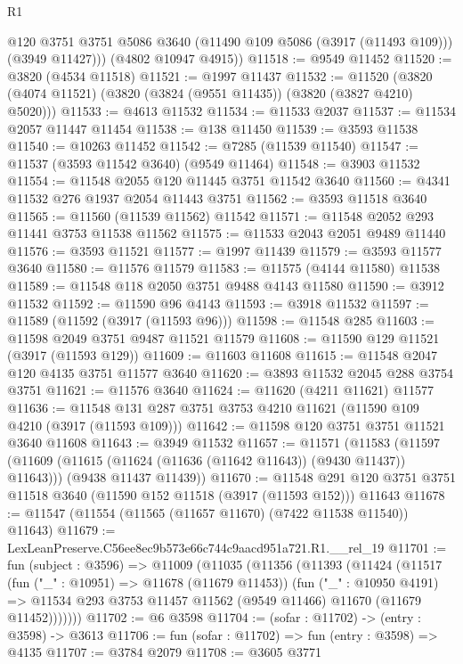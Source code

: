 \begin{lexlean}{R1}
\begin{coremodule}
          @120
          @3751
          @3751
          @5086
          @3640
          (@11490 @109 @5086 (@3917 (@11493 @109)))
          (@3949 @11427)))
      (@4802 @10947 @4915))
@11518 := @9549 @11452
@11520 := @3820 (@4534 @11518)
@11521 := @1997 @11437
@11532 := @11520 (@3820 (@4074 @11521) (@3820 (@3824 (@9551 @11435)) (@3820 (@3827 @4210) @5020)))
@11533 := @4613 @11532
@11534 := @11533 @2037
@11537 := @11534 @2057 @11447 @11454
@11538 := @138 @11450
@11539 := @3593 @11538
@11540 := @10263 @11452
@11542 := @7285 (@11539 @11540)
@11547 := @11537 (@3593 @11542 @3640) (@9549 @11464)
@11548 := @3903 @11532
@11554 := @11548 @2055 @120 @11445 @3751 @11542 @3640
@11560 := @4341 @11532 @276 @1937 @2054 @11443 @3751
@11562 := @3593 @11518 @3640
@11565 := @11560 (@11539 @11562) @11542
@11571 := @11548 @2052 @293 @11441 @3753 @11538 @11562
@11575 := @11533 @2043 @2051 @9489 @11440
@11576 := @3593 @11521
@11577 := @1997 @11439
@11579 := @3593 @11577 @3640
@11580 := @11576 @11579
@11583 := @11575 (@4144 @11580) @11538
@11589 := @11548 @118 @2050 @3751 @9488 @4143 @11580
@11590 := @3912 @11532
@11592 := @11590 @96 @4143
@11593 := @3918 @11532
@11597 := @11589 (@11592 (@3917 (@11593 @96)))
@11598 := @11548 @285
@11603 := @11598 @2049 @3751 @9487 @11521 @11579
@11608 := @11590 @129 @11521 (@3917 (@11593 @129))
@11609 := @11603 @11608
@11615 := @11548 @2047 @120 @4135 @3751 @11577 @3640
@11620 := @3893 @11532 @2045 @288 @3754 @3751
@11621 := @11576 @3640
@11624 := @11620 (@4211 @11621) @11577
@11636 := @11548 @131 @287 @3751 @3753 @4210 @11621 (@11590 @109 @4210 (@3917 (@11593 @109)))
@11642 := @11598 @120 @3751 @3751 @11521 @3640 @11608
@11643 := @3949 @11532
@11657 := @11571
    (@11583
      (@11597 (@11609 (@11615 (@11624 (@11636 (@11642 @11643)) (@9430 @11437)) @11643)))
      (@9438 @11437 @11439))
@11670 := @11548
    @291
    @120
    @3751
    @3751
    @11518
    @3640
    (@11590 @152 @11518 (@3917 (@11593 @152)))
    @11643
@11678 := @11547 (@11554 (@11565 (@11657 @11670) (@7422 @11538 @11540)) @11643)
@11679 := LexLeanPreserve.C56ee8ec9b573e66c744c9aacd951a721.R1.__rel_19
@11701 := fun (subject : @3596) =>
  @11009
    (@11035
      (@11356
        (@11393
          (@11424
            (@11517
              (fun ("_" : @10951) => @11678 (@11679 @11453))
              (fun ("_" : @10950 @4191) =>
              @11534 @293 @3753 @11457 @11562 (@9549 @11466) @11670 (@11679 @11452)))))))
@11702 := @6 @3598
@11704 := (sofar : @11702) -> (entry : @3598) -> @3613
@11706 := fun (sofar : @11702) => fun (entry : @3598) => @4135
@11707 := @3784 @2079
@11708 := @3605 @3771

\end{coremodule}
\end{lexlean}
